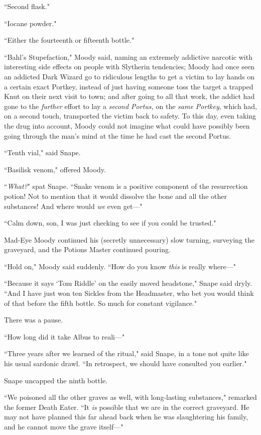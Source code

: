 ``Second flask."

``Iocane powder."

``Either the fourteenth or fifteenth bottle."

``Bahl's Stupefaction," Moody said, naming an extremely addictive narcotic with interesting side effects on people with Slytherin tendencies; Moody had once seen an addicted Dark Wizard go to ridiculous lengths to get a victim to lay hands on a certain exact Portkey, instead of just having someone toss the target a trapped Knut on their next visit to town; and after going to all that work, the addict had gone to the \emph{further} effort to lay a \emph{second Portus,} on the \emph{same Portkey}, which had, on a second touch, transported the victim back to safety. To this day, even taking the drug into account, Moody could not imagine what could have possibly been going through the man's mind at the time he had cast the second Portus.

``Tenth vial," said Snape.

``Basilisk venom," offered Moody.

``\emph{What?}" spat Snape. ``Snake venom is a positive component of the resurrection potion! Not to mention that it would dissolve the bone and all the other substances! And where would \emph{we} even get—"

``Calm down, son, I was just checking to see if you could be trusted."

Mad-Eye Moody continued his (secretly unnecessary) slow turning, surveying the graveyard, and the Potions Master continued pouring.

``Hold on," Moody said suddenly. ``How do you know \emph{this} is really where—"

``Because it says `Tom Riddle' on the easily moved headstone," Snape said dryly. ``And I have just won ten Sickles from the Headmaster, who bet you would think of that before the fifth bottle. So much for constant vigilance."

There was a pause.

``How long did it take Albus to reali—"

``Three years after we learned of the ritual," said Snape, in a tone not quite like his usual sardonic drawl. ``In retrospect, we should have consulted you earlier."

Snape uncapped the ninth bottle.

``We poisoned all the other graves as well, with long-lasting substances," remarked the former Death Eater. ``It \emph{is} possible that we are in the correct graveyard. He may not have planned this far ahead back when he was slaughtering his family, and he cannot move the grave itself—"


